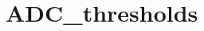 \hypertarget{group___a_d_c__thresholds}{\section{A\-D\-C\-\_\-thresholds}
\label{group___a_d_c__thresholds}
}
